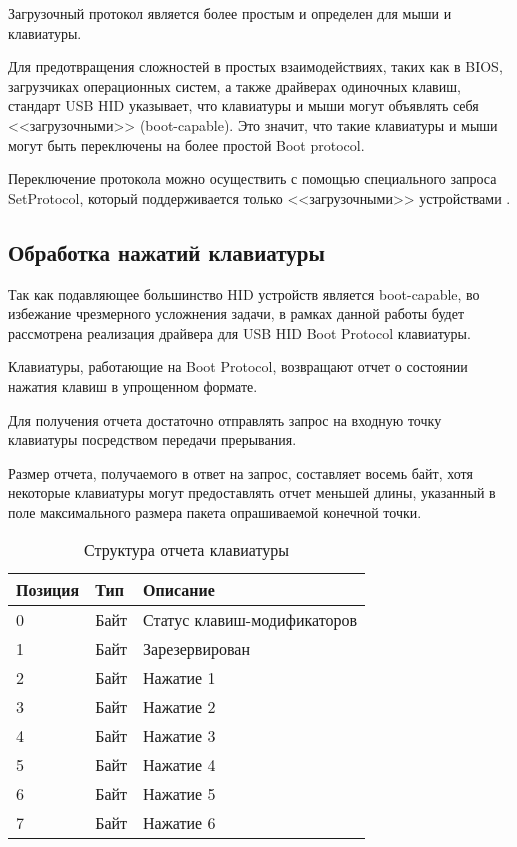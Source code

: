 Загрузочный протокол является более простым и определен для мыши и клавиатуры.

Для предотвращения сложностей в простых взаимодействиях,
таких как в BIOS, загрузчиках операционных систем, а также драйверах одиночных клавиш, 
стандарт USB HID указывает, что клавиатуры и мыши 
могут объявлять себя <<загрузочными>> (boot-capable).
Это значит, что такие клавиатуры и мыши могут быть
переключены на более простой Boot protocol.

Переключение протокола можно осуществить с помощью специального запроса SetProtocol,
который поддерживается только <<загрузочными>> устройствами \cite{hid}.

\subsection{Обработка нажатий клавиатуры}

Так как подавляющее большинство HID устройств является boot-capable, во избежание чрезмерного
усложнения задачи, в рамках данной работы будет рассмотрена 
реализация драйвера для USB HID Boot Protocol клавиатуры.

Клавиатуры, работающие на Boot Protocol, возвращают отчет о состоянии нажатия клавиш
в упрощенном формате.

Для получения отчета достаточно отправлять запрос на входную точку клавиатуры посредством
передачи прерывания.

Размер отчета, получаемого в ответ на запрос, составляет восемь байт, хотя некоторые клавиатуры
могут предоставлять отчет меньшей длины, указанный в поле максимального размера пакета опрашиваемой
конечной точки.

\begin{table}[H] 
    \caption{Структура отчета клавиатуры}
    \begin{tabular}{| m{2cm} | m{2cm} | m{8cm} |}
        \hline
        Позиция &  Тип   & Описание                    \\
        \hline
        0       &  Байт  & Статус клавиш-модификаторов \\
        \hline
        1       &  Байт  & Зарезервирован              \\
        \hline
        2       &  Байт  & Нажатие 1                   \\
        \hline
        3       &  Байт  & Нажатие 2                   \\
        \hline
        4       &  Байт  & Нажатие 3                   \\
        \hline
        5       &  Байт  & Нажатие 4                   \\
        \hline
        6       &  Байт  & Нажатие 5                   \\
        \hline
        7       &  Байт  & Нажатие 6                   \\
        \hline
    \end{tabular}
    \label{report}
\end{table}

